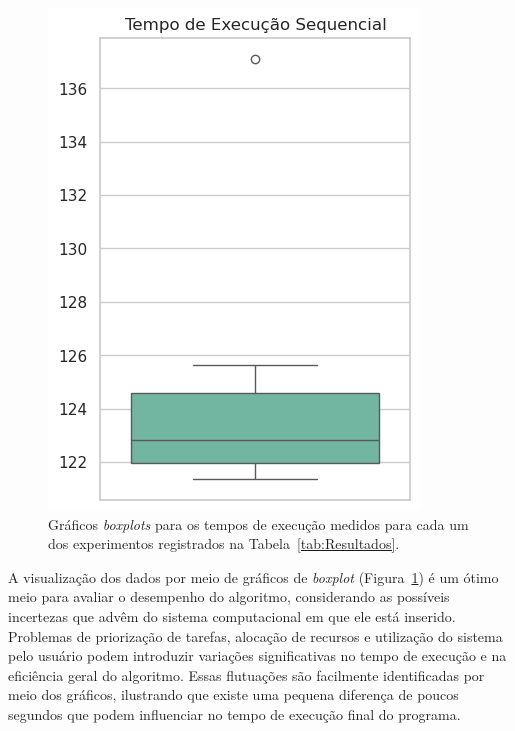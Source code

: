 \documentclass[12pt]{article}
\begin{document}
\begin{figure}[ht]
\begin{minipage}[b]{0.25\textwidth}
  \end{minipage}
  \begin{minipage}[b]{0.25\textwidth}
    \centering
    \includegraphics[width=\textwidth]{figs/times_boxplot_sequential.png}
  \end{minipage}
  \caption{Gráficos \textit{boxplots} para os tempos de execução medidos para cada um dos experimentos registrados na Tabela~\ref{tab:Resultados}. }\label{fig:Boxplots}
\end{figure}

A visualização dos dados por meio de gráficos de \textit{boxplot}
(Figura~\ref{fig:Boxplots}) é um ótimo meio para avaliar o desempenho do
algoritmo, considerando as possíveis incertezas que advêm do sistema
computacional em que ele está inserido. Problemas de priorização de tarefas,
alocação de recursos e utilização do sistema pelo usuário podem introduzir
variações significativas no tempo de execução e na eficiência geral do
algoritmo. Essas flutuações são facilmente identificadas por meio dos gráficos,
ilustrando que existe uma pequena diferença de poucos segundos que podem
influenciar no tempo de execução final do programa.
\end{document}
